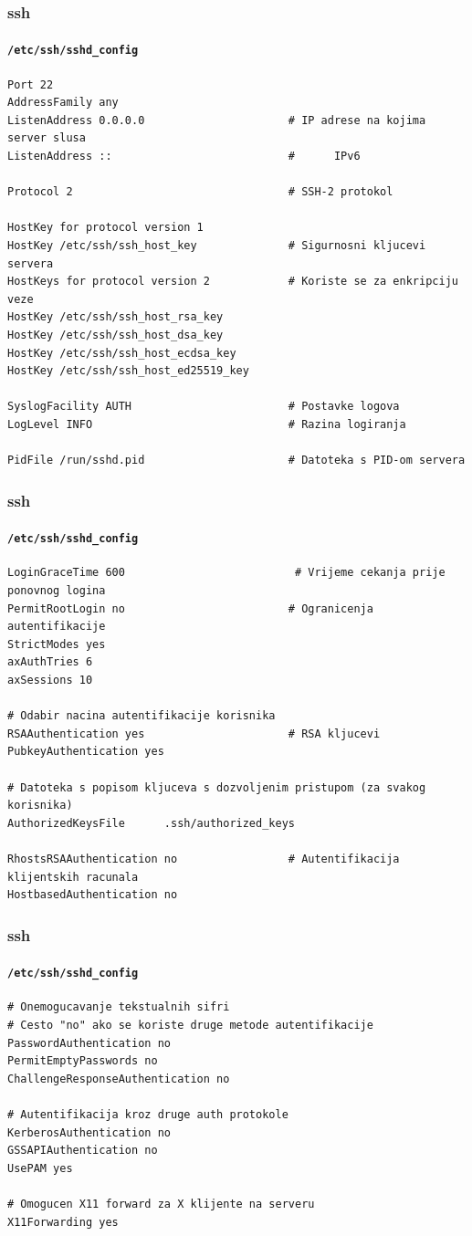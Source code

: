 \documentclass[t,table,usenames,dvipsnames]{beamer}
\begin{document}
\begin{frame}[fragile]
	\frametitle{ssh}
	\framesubtitle{\texttt{/etc/ssh/sshd\_config}}
	\scriptsize
	\begin{verbatim}
Port 22
AddressFamily any
ListenAddress 0.0.0.0                      # IP adrese na kojima server slusa
ListenAddress ::                           #      IPv6

Protocol 2                                 # SSH-2 protokol

HostKey for protocol version 1
HostKey /etc/ssh/ssh_host_key              # Sigurnosni kljucevi servera
HostKeys for protocol version 2            # Koriste se za enkripciju veze
HostKey /etc/ssh/ssh_host_rsa_key
HostKey /etc/ssh/ssh_host_dsa_key
HostKey /etc/ssh/ssh_host_ecdsa_key
HostKey /etc/ssh/ssh_host_ed25519_key

SyslogFacility AUTH                        # Postavke logova
LogLevel INFO                              # Razina logiranja

PidFile /run/sshd.pid                      # Datoteka s PID-om servera
	\end{verbatim}


\end{frame}

\begin{frame}[fragile]
	\frametitle{ssh}
	\framesubtitle{\texttt{/etc/ssh/sshd\_config}}
	\scriptsize
	\begin{verbatim}
LoginGraceTime 600                          # Vrijeme cekanja prije ponovnog logina
PermitRootLogin no                         # Ogranicenja autentifikacije
StrictModes yes
axAuthTries 6
axSessions 10

# Odabir nacina autentifikacije korisnika
RSAAuthentication yes                      # RSA kljucevi
PubkeyAuthentication yes

# Datoteka s popisom kljuceva s dozvoljenim pristupom (za svakog korisnika)
AuthorizedKeysFile      .ssh/authorized_keys

RhostsRSAAuthentication no                 # Autentifikacija klijentskih racunala
HostbasedAuthentication no
	\end{verbatim}

\end{frame}

\begin{frame}[fragile]
	\frametitle{ssh}
	\framesubtitle{\texttt{/etc/ssh/sshd\_config}}
	\scriptsize
	\begin{verbatim}
# Onemogucavanje tekstualnih sifri
# Cesto "no" ako se koriste druge metode autentifikacije
PasswordAuthentication no
PermitEmptyPasswords no
ChallengeResponseAuthentication no

# Autentifikacija kroz druge auth protokole
KerberosAuthentication no
GSSAPIAuthentication no
UsePAM yes

# Omogucen X11 forward za X klijente na serveru
X11Forwarding yes

	\end{verbatim}

\end{frame}
\end{document}

